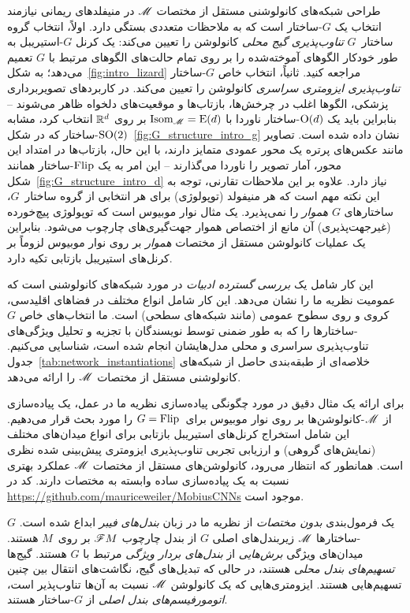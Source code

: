 طراحی شبکه‌های کانولوشنی مستقل از مختصات $\mathscr{M}$ در منیفلدهای ریمانی نیازمند انتخاب یک $G$-ساختار است که به ملاحظات متعددی بستگی دارد.
اولاً، انتخاب گروه ساختار~$G$ \emph{تناوب‌پذیری گیج محلی} کانولوشن را تعیین می‌کند:
یک کرنل $G$-استیریبل به طور خودکار الگوهای آموخته‌شده را بر روی تمام حالت‌های الگوهای مرتبط با $G$ تعمیم می‌دهد؛ به شکل~\ref{fig:intro_lizard} مراجعه کنید.
ثانیاً، انتخاب خاص $G$-ساختار \emph{تناوب‌پذیری ایزومتری سراسری} کانولوشن را تعیین می‌کند.
در کاربردهای تصویربرداری پزشکی، الگوها اغلب در چرخش‌ها، بازتاب‌ها و موقعیت‌های دلخواه ظاهر می‌شوند
-- بنابراین باید یک $\operatorname{O}(d)$-ساختار ناوردا با $\operatorname{Isom}_{\mathscr{M}} = \operatorname{E}(d)$ بر روی $\mathbb{R}^d$ انتخاب کرد، مشابه $\operatorname{SO}(2)$-ساختار که در شکل~\ref{fig:G_structure_intro_g} نشان داده شده است.
تصاویر مانند عکس‌های پرتره یک محور عمودی متمایز دارند، با این حال، بازتاب‌ها در امتداد این محور، آمار تصویر را ناوردا می‌گذارند
-- این امر به یک $\text{Flip}$-ساختار همانند شکل~\ref{fig:G_structure_intro_d} نیاز دارد.
علاوه بر این ملاحظات تقارنی، توجه به این نکته مهم است که هر منیفولد (توپولوژی) برای هر انتخابی از گروه ساختار~$G$، ساختارهای $G$ \emph{هموار} را نمی‌پذیرد.
یک مثال نوار موبیوس است که توپولوژی پیچ‌خورده (غیرجهت‌پذیری) آن مانع از اختصاص هموار جهت‌گیری‌های چارچوب می‌شود.
بنابراین یک عملیات کانولوشن مستقل از مختصات \emph{هموار} بر روی نوار موبیوس لزوماً بر کرنل‌های استیریبل بازتابی تکیه دارد.


این کار شامل یک \emph{بررسی گسترده ادبیات} در مورد شبکه‌های کانولوشنی است که عمومیت نظریه ما را نشان می‌دهد.
این کار شامل انواع مختلف  در فضاهای اقلیدسی،  کروی و  روی سطوح عمومی (مانند شبکه‌های سطحی) است.
ما انتخاب‌های خاص $G$-ساختارها را که به طور ضمنی توسط نویسندگان با تجزیه و تحلیل ویژگی‌های تناوب‌پذیری سراسری و محلی مدل‌هایشان انجام شده است، شناسایی می‌کنیم.
جدول~\ref{tab:network_instantiations} خلاصه‌ای از طبقه‌بندی حاصل از شبکه‌های کانولوشنی مستقل از مختصات $\mathscr{M}$ را ارائه می‌دهد.


برای ارائه یک مثال دقیق در مورد چگونگی پیاده‌سازی نظریه ما در عمل، یک پیاده‌سازی از $\mathscr{M}$-کانولوشن‌ها بر روی نوار موبیوس برای~$G=\text{Flip}$ را مورد بحث قرار می‌دهیم.
این شامل استخراج کرنل‌های استیریبل بازتابی برای انواع میدان‌های مختلف (نمایش‌های گروهی) و ارزیابی تجربی تناوب‌پذیری ایزومتری پیش‌بینی شده نظری است.
همانطور که انتظار می‌رود، کانولوشن‌های مستقل از مختصات $\mathscr{M}$ عملکرد بهتری نسبت به یک پیاده‌سازی ساده وابسته به مختصات دارند.
کد در \url{https://github.com/mauriceweiler/MobiusCNNs} موجود است.

یک فرمول‌بندی \emph{بدون مختصات} از نظریه ما در زبان \emph{بندل‌های فیبر} ابداع شده است.
$G$-ساختارها $\mathscr{M}$ زیربندل‌های اصلی $G$ از بندل چارچوب $\mathscr{F}M$ بر روی~$M$ هستند.
میدان‌های ویژگی \emph{برش‌هایی} از \emph{بندل‌های بردار ویژگی} مرتبط با $G$ هستند.
گیج‌ها \emph{تسهیم‌های بندل محلی} هستند، در حالی که تبدیل‌های گیج، نگاشت‌های انتقال بین چنین تسهیم‌هایی هستند.
ایزومتری‌هایی که یک کانولوشن $\mathscr{M}$ نسبت به آن‌ها تناوب‌پذیر است، \emph{اتومورفیسم‌های بندل اصلی} از $G$-ساختار هستند.


